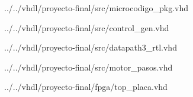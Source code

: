 \documentclass[llncs]{llncs}
\begin{document}

{../../vhdl/proyecto-final/src/microcodigo_pkg.vhd}


{../../vhdl/proyecto-final/src/control_gen.vhd}


{../../vhdl/proyecto-final/src/datapath3_rtl.vhd}


{../../vhdl/proyecto-final/src/motor_pasos.vhd}


{../../vhdl/proyecto-final/fpga/top_placa.vhd}
\end{document}
